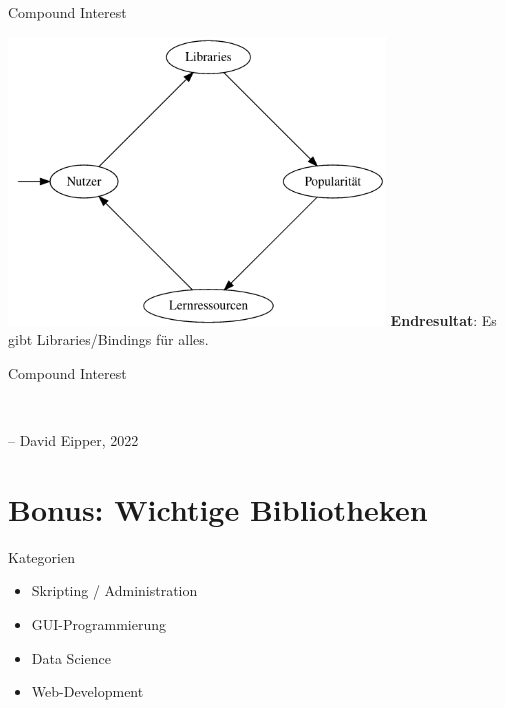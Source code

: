 \documentclass{beamer}
\begin{document}
\begin{frame}{Compound Interest}
\begin{center}
\includegraphics[width=100mm]{assets/circle.png}
\textbf{Endresultat}: Es gibt Libraries/Bindings f\"ur alles.
\end{center}
\end{frame}

\begin{frame}{Compound Interest}
\begin{center}
{ \large {}}\\
\end{center}
-- David Eipper, 2022
\end{frame}

\section{Bonus: Wichtige Bibliotheken}

\begin{frame}{Kategorien}
\Huge
\begin{center}
\begin{itemize}
\item Skripting / Administration
\item GUI-Programmierung
\item Data Science
\item Web-Development
\end{itemize}
\end{center}
\end{frame}
\end{document}
